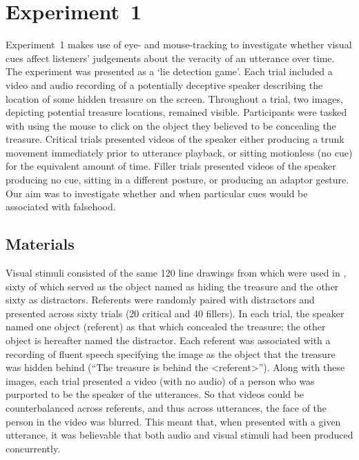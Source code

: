 \documentclass[a4paper,man,natbib]{apa6}
\begin{document}
\section{Experiment~1}
Experiment~1 makes use of eye- and mouse-tracking to investigate whether visual cues affect listeners' judgements about the veracity of an utterance over time. 
The experiment was presented as a `lie detection game'.
Each trial included a video and audio recording of a potentially deceptive speaker describing the location of some hidden treasure on the screen.
Throughout a trial, two images, depicting potential treasure locations, remained visible. 
Participants were tasked with using the mouse to click on the object they believed to be concealing the treasure.
Critical trials presented videos of the speaker either producing a trunk movement immediately prior to utterance playback, or sitting motionless (no cue) for the equivalent amount of time.
Filler trials presented videos of the speaker producing no cue, sitting in a different posture, or producing an adaptor gesture. 
Our aim was to investigate whether and when particular cues would be associated with falsehood.


\subsection{Materials}
Visual stimuli consisted of the same 120 line drawings from \citet{Snodgrass1980} which were used in \citet{Loy2017}, sixty of which served as the object named as hiding the treasure and the other sixty as distractors.
Referents were randomly paired with distractors and presented across sixty trials (20 critical and 40 fillers). 
In each trial, the speaker named one object (referent) as that which concealed the treasure; the other object is hereafter named the distractor.
Each referent was associated with a recording of fluent speech specifying the image as the object that the treasure was hidden behind (``The treasure is behind the <referent>'').
Along with these images, each trial presented a video (with no audio) of a person who was purported to be the speaker of the utterances. 
So that videos could be counterbalanced across referents, and thus across utterances, the face of the person in the video was blurred. 
This meant that, when presented with a given utterance, it was believable that both audio and visual stimuli had been produced concurrently. 
\end{document}
